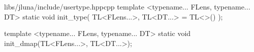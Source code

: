 \begin{fileminted}{libs/jluna/include/usertype.hpp}{cpp}
template <typename... FLens, typename... DT>
static void init_type(
    TL<FLens...>, 
    TL<DT...> = TL<>()
);

template <typename... FLens, typename... DT>
static void init_dmap(TL<FLens...>, TL<DT...>);
\end{fileminted}